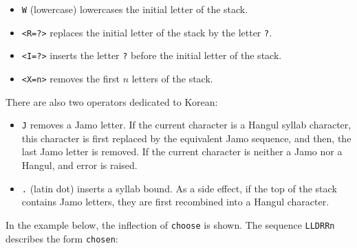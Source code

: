 \begin{itemize}
  \item \verb+W+ (lowercase)
  lowercases the initial letter of the stack.

  \item \verb+<R=?>+ 
  replaces the initial letter of the stack by the letter \verb+?+.

  \item \verb+<I=?>+ 
  inserts the letter \verb+?+ before the initial letter of the stack. 

  \item \verb+<X=n>+ 
  removes the first $n$ letters of the stack. 
   
\end{itemize}

\noindent There are also two operators dedicated to Korean:
\begin{itemize}
    \item \verb+J+ removes a Jamo letter.
    If the current character is a Hangul
    syllab character, this character is first replaced by the equivalent Jamo
    sequence, and then, the last Jamo letter is removed. If the current
    character is neither a Jamo nor a Hangul, and error is raised.
    
    \item \verb+.+ (latin dot)
    inserts a syllab bound. As a side effect, if the
    top of the stack contains Jamo letters, they are first recombined into a
    Hangul character.
    \end{itemize}


\bigskip
\noindent In the example below, the inflection of \verb+choose+ is
shown. The sequence \verb+LLDRRn+ describes the form \verb+chosen+:

